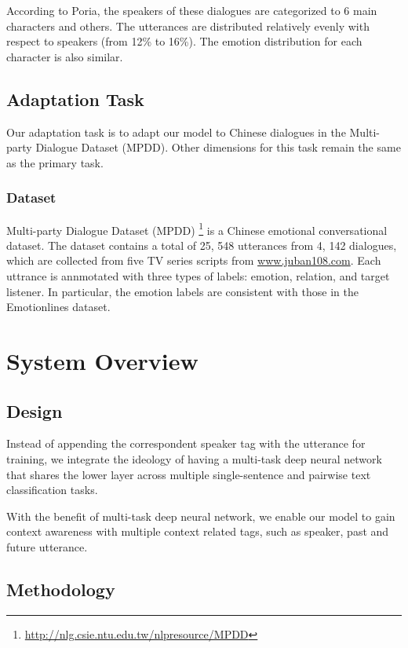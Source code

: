 \documentclass[11pt]{article}
\begin{document}
According to Poria, the speakers of these dialogues are categorized to 6 main characters and others. The utterances are distributed relatively evenly with respect to speakers (from 12\% to 16\%).  The emotion distribution for each character is also similar. 


\subsection{Adaptation Task}
\label{sect:adaptation_task}

Our adaptation task is to adapt our model to Chinese dialogues in the Multi-party Dialogue Dataset (MPDD). Other dimensions for this task remain the same as the primary task.

\subsubsection{Dataset}

Multi-party Dialogue Dataset (MPDD) \citep{chen-etal-2020-mpdd} \footnote{\url{http://nlg.csie.ntu.edu.tw/nlpresource/MPDD}} is a Chinese emotional conversational dataset. The dataset contains a total of 25, 548 utterances from 4, 142 dialogues, which are collected from five TV series scripts from \url{www.juban108.com}. Each uttrance is annmotated with three types of labels: emotion, relation, and target listener. In particular, the emotion labels are consistent with those in the Emotionlines dataset.


\section{System Overview}
\label{sec:overview}

\subsection{Design}

Instead of appending the correspondent speaker tag with the utterance for training, we integrate the ideology of having a multi-task deep neural network that shares the lower layer across multiple single-sentence and pairwise text classification tasks. 

With the benefit of multi-task deep neural network, we enable our model to gain context awareness with multiple context related tags, such as speaker, past and future utterance.

\subsection{Methodology}
\end{document}
